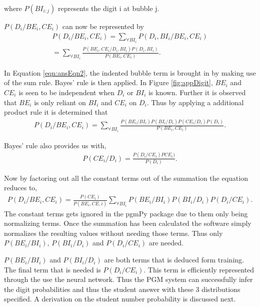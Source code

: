 where  $P(BI_{i:j})$ represents the digit i at bubble j.

$P(D_i/BE_i,CE_i)$ can now be represented by
\begin{align}
  P(D_i/BE_i,CE_i)	=  \sum_{\forall BI_i}^{}  P(D_i,BI_i/BE_i,CE_i)\\
  					=  \sum_{\forall BI_i}^{}  \frac{P(BE_i,CE_i/D_i,BI_i)P(D_i,BI_i)}{P(BE_i,CE_i)}.
\label{eqn:ansEqn2}
\end{align}

In Equation \ref{eqn:ansEqn2}, the indented bubble term is brought in by making use of the sum rule. Bayes' rule is then applied. In Figure \ref{fig:appDigit}, $BE_i$ and $CE_i$ is seen to be independent when $D_i$ or $BI_i$ is known. Further it is observed that $BE_i$ is only reliant on $BI_i$ and $CE_i$ on $D_i$. Thus by applying a additional product rule it is determined that
\begin{align}
  P(D_i/BE_i,CE_i) =  \sum_{\forall BI_i}^{}\frac{P(BE_i/BI_i)P(BI_i/D_i)P(CE_i/D_i)P(D_i)}{P(BE_i,CE_i)}.
\label{eqn:ansEqn3}
\end{align}

Bayes' rule also provides us with,
\begin{align}
  P(CE_i/D_i)	=  \frac{P(D_i/CE_i)PCE_i)}{P(D_i)}.
\label{eqn:ansEqn4}
\end{align}

Now by factoring out all the constant terms out of the summation the equation reduces to,
\begin{align}
  P(D_i/BE_i,CE_i) =  \frac{P(CE_i)}{P(BE_i,CE,i)}\sum_{\forall BI_i}^{}P(BE_i/BI_i)P(BI_i/D_i)P(D_i/CE_i).
\label{eqn:ansEqn5}
\end{align}
The constant terms gets ignored in the pgmPy package due to them only being normalizing terms. Once the summation has been calculated the software simply normalizes the resulting values without needing those terms. Thus only $P(BE_i/BI_i)$, $P(BI_i/D_i)$ and $P(D_i/CE_i)$ are needed.

$P(BE_i/BI_i)$ and  $P(BI_i/D_i)$ are both terms that is deduced form training. The final term that is needed is $P(D_i/CE_i)$. This term is efficiently represented through the use the neural network. Thus the PGM system can successfully infer the digit probabilities and thus the student answer with these 3 distributions specified. A derivation on the student number probability is discussed next.

